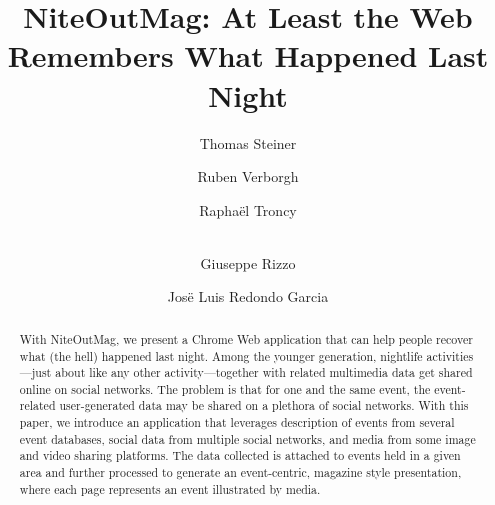 \documentclass[runningheads,a4paper]{llncs}
\begin{document}
\title{NiteOutMag: At Least the Web\\ Remembers What Happened Last Night}

\author{Thomas Steiner \and
		Ruben Verborgh \and
        Rapha\"el Troncy \and\\
		Giuseppe Rizzo \and
		Jos\"e Luis Redondo Garcia		
}


\maketitle

\begin{abstract}
With NiteOutMag, we present a Chrome Web application that can help people recover what (the hell) happened last night. Among the younger generation, nightlife activities---just about like any other activity---together with related multimedia data get shared online on social networks. The problem is that for one and the same event, the event-related user-generated data may be shared on a plethora of social networks. With this paper, we introduce an application that leverages description of events from several event databases, social data from multiple social networks, and media from some image and video sharing platforms. The data collected is attached to events held in a given area and further processed to generate an event-centric, magazine style presentation, where each page represents an event illustrated by media.
\end{abstract}

\end{document}

